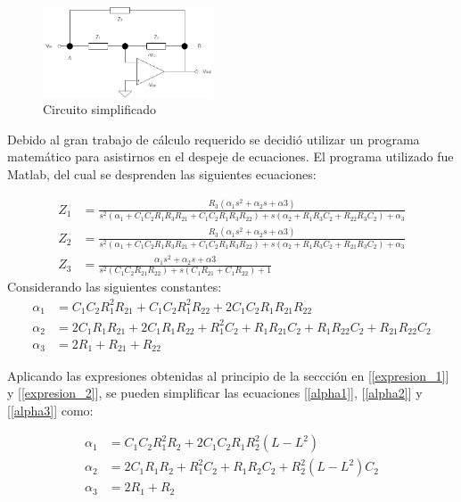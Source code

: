 \begin{figure}[h]
	\centering
	\includegraphics[width=0.45\textwidth]{../Ejercicio4-EcualizadorDeFase/Informe/EcFinal.png}
	\caption{Circuito simplificado}
	\label{Cir_Final}
\end{figure}

Debido al gran trabajo de cálculo requerido se decidió utilizar 
un programa matemático para asistirnos en el despeje de ecuaciones. 
El programa utilizado fue Matlab, del cual se desprenden las 
siguientes ecuaciones: \par 

\vspace{2mm}
\begin{align}
	Z_1 &= \frac{R_3(\alpha_1s^2+\alpha_2s+\alpha3)}{s^2(\alpha_1+C_1C_2R_1R_3R_{21}+C_1C_2R_1R_3R_{22})+s(\alpha_2+R_1R_3C_2+R_{22}R_3C_2)+\alpha_3} \label{z1} \\ 	
	Z_2 &= \frac{R_3(\alpha_1s^2+\alpha_2s+\alpha3)}{s^2(\alpha_1+C_1C_2R_1R_3R_{21}+C_1C_2R_1R_3R_{22})+s(\alpha_2+R_1R_3C_2+R_{21}R_3C_2)+\alpha_3} \label{z2} \\ 	
	Z_3 &= \frac{\alpha_1s^2+\alpha_2s+\alpha3}{s^2(C_1C_2R_{21}R_{22})+s(C_1R_{21}+C_1R_{22})+1} \label{z3}  	
\end{align}
\vspace{2mm}
Considerando las siguientes constantes:
\vspace{2mm}
\begin{align}
	\alpha_1 &= C_1C_2R_1^2R_{21}+C_1C_2R_1^2R_{22}+2C_1C_2R_1R_{21}R_{22}  \label{alpha1} \\ 	
	\alpha_2 &= 2C_1R_1R_{21}+2C_1R_1R_{22}+R_1^2C_2+R_1R_{21}C_2+R_1R_{22}C_2+R_{21}R_{22}C_2 \label{alpha2} \\ 	
	\alpha_3 &=  2R_1+R_{21}+R_{22}\label{alpha3}  	
\end{align}
\vspace{2mm}

Aplicando las expresiones obtenidas al principio de la seccción en 
[\ref{expresion_1}] y [\ref{expresion_2}], se pueden simplificar las ecuaciones 
[\ref{alpha1}],  [\ref{alpha2}] y [\ref{alpha3}] como:

\vspace{2mm}
\begin{align}
	\alpha_1 &= C_1C_2R_1^2R_2+2C_1C_2R_1R_2^2(L-L^2)  \label{alpha1_simplificado} \\ 	
	\alpha_2 &= 2C_1R_1R_2+R_1^2C_2+R_1R_2C_2+R_2^2(L-L^2)C_2 \label{alpha2_simplificado} \\ 	
	\alpha_3 &=  2R_1+R_2\label{alpha3_simplificado}  	
\end{align}
\vspace{2mm}

